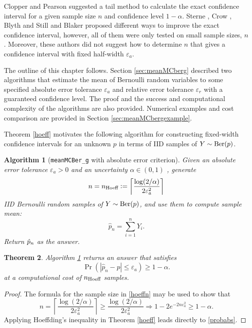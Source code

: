 \documentclass{iitthesis}
\newtheorem{theorem}{Theorem}[section]
\newtheorem{algorithm}[theorem]{Algorithm}
\begin{document}
Clopper and Pearson \cite{CP34} suggested a tail method to calculate the exact confidence interval for a given sample size $n$ and confidence level $1-\alpha$. Sterne \cite{sterne54}, Crow \cite{crow56}, Blyth and Still \cite{BS83} and Blaker \cite{Blaker00} proposed different ways to improve the exact confidence interval, however, all of them were only tested on small sample sizes, $n$.  Moreover, these authors did not suggest how to determine $n$ that gives a confidence interval with fixed half-width $\varepsilon_a$. 

The outline of this chapter follows. Section \ref{sec:meanMCberg} described two algorithms that estimate the mean of Bernoulli random variables to some specified absolute error tolerance $\varepsilon_a$ and relative error tolerance $\varepsilon_r$ with a guaranteed confidence level. The proof and the success and computational complexity of the algorithms are also provided. Numerical examples and cost comparison are provided in Section \ref{sec:meanMCbergexample}. 

 \label{sec:meanMCberg}
Theorem \ref{hoeff} motivates the following algorithm for constructing fixed-width confidence intervals for an unknown $p$ in terms of IID samples of $Y\sim \operatorname{Ber}(p)$.
\begin{algorithm}[{\tt meanMCBer\_g} with absolute error criterion]\label{algabs}
Given an absolute error tolerance $\varepsilon_a > 0$ and an uncertainty $\alpha \in (0,1)$ , generate
\begin{equation}\label{hoeffn}
n = n_{\text{Hoeff}} := \left \lceil  \frac{\log(2/\alpha)}{2\varepsilon_a^2} \right \rceil
\end{equation}
IID Bernoulli random samples of $Y \sim \operatorname{Ber}(p)$, and use them to compute sample mean:
\begin{equation} \label{abserrp}
\hat{p}_n = \sum_{i =1}^n Y_i.
\end{equation}
Return $\hat{p}_n$ as the answer.
\end{algorithm}
\begin{theorem}
Algorithm \ref{algabs} returns an answer that satisfies 
\begin{equation}\label{probabs}
\Pr\left(|\hat{p}_n -p| \leq \varepsilon_a\right) \geq 1-\alpha.
\end{equation}
at a computational cost of $n_{\text{Hoeff}}$ samples.
\end{theorem}
\begin{proof}
The formula for the sample size in \eqref{hoeffn} may be used to show that
\begin{equation*}
n = \left \lceil \frac{\log(2/\alpha)}{2\varepsilon_a^2} \right \rceil \geq  \frac{\log(2/\alpha)}{2\varepsilon_a^2} \Rightarrow 
1- 2e^{-2n\varepsilon_a^2} \geq 1-\alpha.
\end{equation*}
Applying Hoeffding's inequality in Theorem \ref{hoeff} leads directly to \eqref{probabs}. 
\end{proof}
\end{document}
